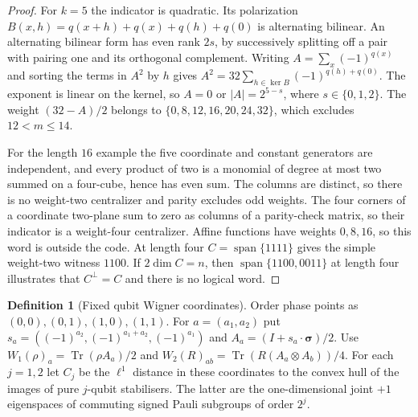 \documentclass[aps,pra,onecolumn,superscriptaddress,nofootinbib,10pt]{revtex4-2}
\theoremstyle{definition}
\newtheorem{definition}[theorem]{Definition}
\theoremstyle{remark}
\newcommand{\tr}{\operatorname{Tr}}
\begin{document}
\begin{proof}
For \(k=5\) the indicator is quadratic. Its polarization
\(B(x,h)=q(x+h)+q(x)+q(h)+q(0)\) is alternating bilinear.
An alternating bilinear form has even rank \(2s\), by successively
splitting off a pair with pairing one and its orthogonal complement.
Writing \(A=\sum_x(-1)^{q(x)}\) and sorting the terms in \(A^2\)
by \(h\) gives
\(A^2=32\sum_{h\in\ker B}(-1)^{q(h)+q(0)}\).
The exponent is linear on the kernel, so \(A=0\) or
\(|A|=2^{5-s}\), where \(s\in\{0,1,2\}\). The weight
\((32-A)/2\) belongs to \(\{0,8,12,16,20,24,32\}\), which
excludes \(12<m\le14\).

For the length \(16\) example the five coordinate and constant
generators are independent, and every product of two is a monomial
of degree at most two summed on a four-cube, hence has even sum.
The columns are distinct, so there is no weight-two centralizer
and parity excludes odd weights. The four corners of a coordinate
two-plane sum to zero as columns of a parity-check matrix,
so their indicator is a weight-four centralizer. Affine functions
have weights \(0,8,16\), so this word is outside the code.
At length four \(C=\operatorname{span}\{1111\}\) gives the
simple weight-two witness \(1100\). If \(2\dim C=n\), then
\(\operatorname{span}\{1100,0011\}\) at length four illustrates
that \(C^\perp=C\) and there is no logical word.
\end{proof}

\begin{definition}[Fixed qubit Wigner coordinates]\label{ob:wigner}
Order phase points as \((0,0),(0,1),(1,0),(1,1)\). For
\(a=(a_1,a_2)\) put
\(s_a=((-1)^{a_2},(-1)^{a_1+a_2},(-1)^{a_1})\) and
\(A_a=(I+s_a\cdot\boldsymbol{\sigma})/2\).
Use \(W_1(\rho)_a=\tr(\rho A_a)/2\) and
\(W_2(R)_{ab}=\tr(R(A_a\otimes A_b))/4\).
For each \(j=1,2\) let \(C_j\) be the \(\ell^1\) distance in
these coordinates to the convex hull of the images of pure
\(j\)-qubit stabilisers. The latter are the one-dimensional joint
\(+1\) eigenspaces of commuting signed Pauli subgroups of order \(2^j\).
\end{definition}
\end{document}
